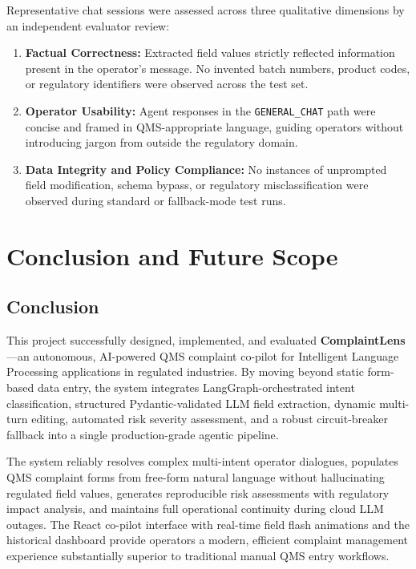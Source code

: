 \documentclass[12pt,a4paper]{report}
\begin{document}
Representative chat sessions were assessed across three qualitative dimensions by an independent evaluator review:

\begin{enumerate}[leftmargin=*]
\item \textbf{Factual Correctness:} Extracted field values strictly reflected information present in the operator's message. No invented batch numbers, product codes, or regulatory identifiers were observed across the test set.
\item \textbf{Operator Usability:} Agent responses in the \texttt{GENERAL\_CHAT} path were concise and framed in QMS-appropriate language, guiding operators without introducing jargon from outside the regulatory domain.
\item \textbf{Data Integrity and Policy Compliance:} No instances of unprompted field modification, schema bypass, or regulatory misclassification were observed during standard or fallback-mode test runs.
\end{enumerate}

\section{Conclusion and Future Scope}

\subsection{Conclusion}

This project successfully designed, implemented, and evaluated \textbf{ComplaintLens}---an autonomous, AI-powered QMS complaint co-pilot for Intelligent Language Processing applications in regulated industries. By moving beyond static form-based data entry, the system integrates LangGraph-orchestrated intent classification, structured Pydantic-validated LLM field extraction, dynamic multi-turn editing, automated risk severity assessment, and a robust circuit-breaker fallback into a single production-grade agentic pipeline.

The system reliably resolves complex multi-intent operator dialogues, populates QMS complaint forms from free-form natural language without hallucinating regulated field values, generates reproducible risk assessments with regulatory impact analysis, and maintains full operational continuity during cloud LLM outages. The React co-pilot interface with real-time field flash animations and the historical dashboard provide operators a modern, efficient complaint management experience substantially superior to traditional manual QMS entry workflows.
\end{document}
